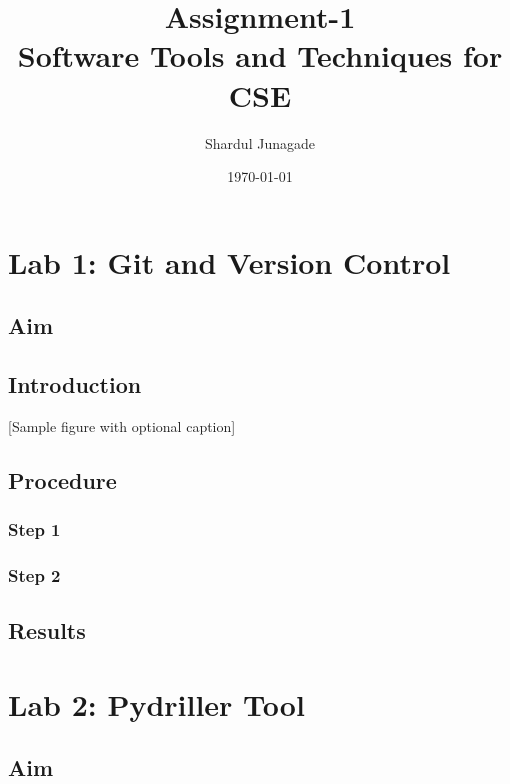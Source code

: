 \documentclass[10pt,a4paper]{report}
\title{\Huge Assignment-1 \\[0.5cm] \LARGE Software Tools and Techniques for CSE}
\author{\Large Shardul Junagade}
\date{\large \today}
\begin{document}
\maketitle
\newpage

\tableofcontents
\newpage

\chapter{Lab 1: Git and Version Control}
\section{Aim}
\lipsum[1]

\section{Introduction}
\lipsum[1]

[Sample figure with optional caption]

\section{Procedure}
\subsection{Step 1}
\lipsum[2]
\lipsum[2]


\subsection{Step 2}
\lipsum[3]

\section{Results}
\lipsum[4]

\chapter{Lab 2: Pydriller Tool}
\section{Aim}
\lipsum[5]
\end{document}
